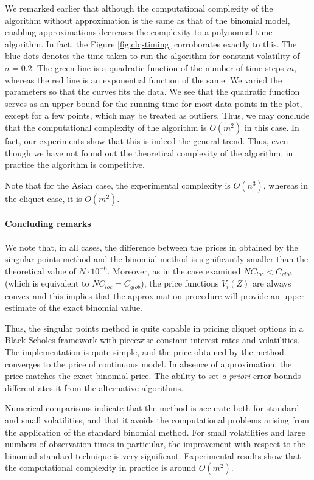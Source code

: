 \begin{rem}
	We remarked earlier that although the computational complexity of the algorithm without approximation is the same as that of the binomial model, enabling approximations decreases the complexity to a polynomial time algorithm. In fact, the Figure \ref{fig:clq-timing} corroborates exactly to this. The blue dots denotes the time taken to run the algorithm for constant volatility of $ \sigma = 0.2 $. The green line is a quadratic function of the number of time steps $ m $, whereas the red line is an exponential function of the same. We varied the parameters so that the curves fits the data. We see that the quadratic function serves as an upper bound for the running time for most data points in the plot, except for a few points, which may be treated as outliers. Thus, we may conclude that the computational complexity of the algorithm is $ O(m^2) $ in this case. In fact, our experiments show that this is indeed the general trend. Thus, even though we have not found out the theoretical complexity of the algorithm, in practice the algorithm is competitive.
	
	Note that for the Asian case, the experimental complexity is $ O(n^3) $, whereas in the cliquet case, it is $ O(m^2) $.
\end{rem}


\paragraph{Concluding remarks}
We note that, in all cases, the difference between the prices in obtained by the singular points method and the binomial method is significantly smaller than the theoretical value of $ N \cdot 10^{-6} $. Moreover, as in the case examined $ N C_{loc} < C_{glob} $ (which is equivalent to $ N C_{loc} = C_{glob} $), the price functions $ V_i(Z) $ are always convex and this implies that the approximation procedure will provide an upper estimate of the exact binomial value.

Thus, the singular points method is quite capable in pricing cliquet options in a Black-Scholes framework with piecewise constant interest rates and volatilities. The implementation is quite simple, and the price obtained by the method converges to the price of continuous model. In absence of approximation, the price matches the exact binomial price. The ability to set \emph{a priori} error bounds differentiates it from the alternative algorithms.

Numerical comparisons indicate that the method is accurate both for standard and small volatilities, and that it avoids the computational problems arising from the application of the standard binomial method. For small volatilities and large numbers of observation times in particular, the improvement with respect to the binomial standard technique is very significant. Experimental results show that the computational complexity in practice is around $ O(m^2) $.


